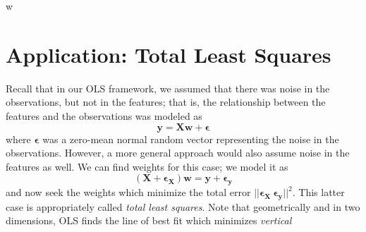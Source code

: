 w\documentclass{article}
\begin{document}
\section*{Application: Total Least Squares}
Recall that in our OLS framework, we assumed that there was noise in the observations, but not in the features; that is, the relationship between the features and the observations was modeled as $$\mathbf{y = Xw + \epsilon}$$ where $\mathbf{\epsilon}$ was a zero-mean normal random vector representing the noise in the observations. However, a more general approach would also assume noise in the features as well. We can find weights for this case; we model it as $$\mathbf{(X + \epsilon_X)w = y + \epsilon_y}$$ and now seek the weights which minimize the total error $||\mathbf{\epsilon_X\ \epsilon_y}||^2$. This latter case is appropriately called \textit{total least squares}. Note that geometrically and in two dimensions, OLS finds the line of best fit which minimizes \textit{vertical} 
\end{document}
